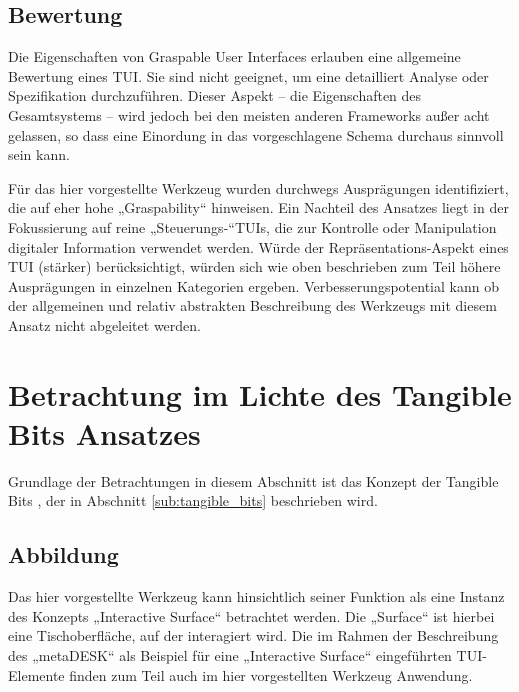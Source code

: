 \subsection{Bewertung}

Die Eigenschaften von Graspable User Interfaces erlauben eine allgemeine Bewertung eines \gls{TUI}. Sie sind nicht geeignet, um eine detailliert Analyse oder Spezifikation durchzuführen. Dieser Aspekt -- die Eigenschaften des Gesamtsystems -- wird jedoch bei den meisten anderen Frameworks außer acht gelassen, so dass eine Einordung in das vorgeschlagene Schema durchaus sinnvoll sein kann.

Für das hier vorgestellte Werkzeug wurden durchwegs Ausprägungen identifiziert, die auf eher hohe „Graspability“ hinweisen. Ein Nachteil des Ansatzes liegt in der Fokussierung auf reine „Steuerungs-“\glspl{TUI}, die zur Kontrolle oder Manipulation digitaler Information verwendet werden. Würde der Repräsentations-Aspekt eines \gls{TUI} (stärker) berücksichtigt, würden sich wie oben beschrieben zum Teil höhere Ausprägungen in einzelnen Kategorien ergeben. Verbesserungspotential kann ob der allgemeinen und relativ abstrakten Beschreibung des Werkzeugs mit diesem Ansatz nicht abgeleitet werden.


\section{Betrachtung im Lichte des Tangible Bits Ansatzes} %
\label{sec:betrachtung_tangible_bits}

Grundlage der Betrachtungen in diesem Abschnitt ist das Konzept der Tangible Bits \citep{Ishii97}, der in Abschnitt \ref{sub:tangible_bits} beschrieben wird.

\subsection{Abbildung} 

Das hier vorgestellte Werkzeug kann hinsichtlich seiner Funktion als eine Instanz des Konzepts „Interactive Surface“ betrachtet werden. Die „Surface“ ist hierbei eine Tischoberfläche, auf der interagiert wird. Die im Rahmen der Beschreibung des „metaDESK“ \citep{Ullmer97} als Beispiel für eine „Interactive Surface“ eingeführten \gls{TUI}-Elemente finden zum Teil auch im hier vorgestellten Werkzeug Anwendung.

